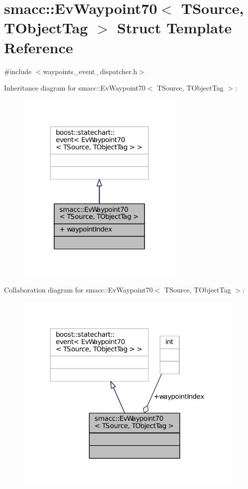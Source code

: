 \hypertarget{structsmacc_1_1EvWaypoint70}{}\section{smacc\+:\+:Ev\+Waypoint70$<$ T\+Source, T\+Object\+Tag $>$ Struct Template Reference}
\label{structsmacc_1_1EvWaypoint70}


{\ttfamily \#include $<$waypoints\+\_\+event\+\_\+dispatcher.\+h$>$}



Inheritance diagram for smacc\+:\+:Ev\+Waypoint70$<$ T\+Source, T\+Object\+Tag $>$\+:
\nopagebreak
\begin{figure}[H]
\begin{center}
\leavevmode
\includegraphics[width=227pt]{structsmacc_1_1EvWaypoint70__inherit__graph}
\end{center}
\end{figure}


Collaboration diagram for smacc\+:\+:Ev\+Waypoint70$<$ T\+Source, T\+Object\+Tag $>$\+:
\nopagebreak
\begin{figure}[H]
\begin{center}
\leavevmode
\includegraphics[width=312pt]{structsmacc_1_1EvWaypoint70__coll__graph}
\end{center}
\end{figure}
